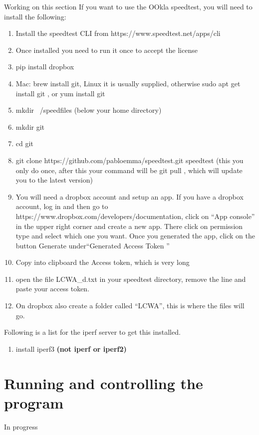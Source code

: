 \documentclass[12pt]{article}
\begin{document}
Working on this section
If you want to use the OOkla speedtest, you will need to install the following:
\begin{enumerate}
\item	Install the speedtest CLI from  https://www.speedtest.net/apps/cli
\item Once installed you need to run it once to accept the license
\item pip install dropbox
\item Mac: brew install git, Linux it is usually supplied, otherwise sudo apt get install git , or yum install git
\item mkdir ~/speedfiles (below your home directory)
\item mkdir git
\item cd git
\item git clone https://github.com/pabloemma/speedtest.git speedtest (this you only do once, after this your command will be git pull , which will update you to the latest version)
\item You will need a dropbox account and setup an app. If you have a dropbox account, log in and then go to https://www.dropbox.com/developers/documentation, click on ``App console'' in the upper right corner and create a new app. There click on permission type and select which one you want. Once you generated the app, click on the button Generate under``Generated Access Token ''
\item Copy into clipboard the Access token, which is very long
\item open the file LCWA\_d.txt in your speedtest directory, remove the line and paste your access token.
\item On dropbox also create a folder called ``LCWA'', this is where the files will go.
\end{enumerate}

Following is a list for the iperf server to get this installed.

\begin{enumerate}
\item install iperf3 \textbf{(not iperf or iperf2)}
\end{enumerate}



\section{Running and controlling the program}

In progress



\end{document}
